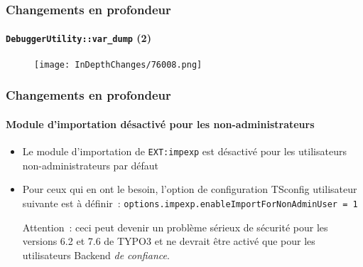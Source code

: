 \begin{frame}[fragile]
	\frametitle{Changements en profondeur}
	\framesubtitle{\texttt{DebuggerUtility::var\_dump} (2)}

	\begin{figure}
		\texttt{[image: InDepthChanges/76008.png]}
	\end{figure}

\end{frame}

\begin{frame}[fragile]
	\frametitle{Changements en profondeur}
	\framesubtitle{Module d'importation désactivé pour les non-administrateurs}

	\begin{itemize}

		\item Le module d'importation de \texttt{EXT:impexp} est désactivé pour les utilisateurs non-administrateurs par défaut

		\item Pour ceux qui en ont le besoin, l'option de configuration TSconfig utilisateur suivante
			est à définir~:\newline
			\texttt{options.impexp.enableImportForNonAdminUser = 1}

			\vspace{0.5cm}

			\begingroup
				\color{typo3red}
				Attention~: ceci peut devenir un problème sérieux de sécurité pour les versions 6.2 et 7.6 de TYPO3
				et ne devrait être activé que pour les utilisateurs Backend \textit{de confiance}.
			\endgroup

	\end{itemize}

\end{frame}

